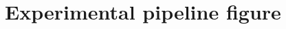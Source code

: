 \documentclass[11pt]{article}
\begin{document}

\section{Experimental pipeline figure}
\label{sec:pipeline_figure}
\end{document}
